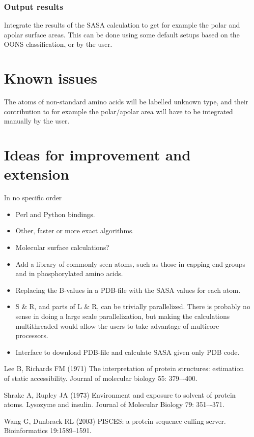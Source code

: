 \documentclass[a4paper,11pt]{article}
\begin{document}
\subsubsection{Output results}
Integrate the results of the SASA calculation to get for example the
polar and apolar surface areas. This can be done using some default
setups based on the OONS classification, or by the user.

\section{Known issues}

The atoms of non-standard amino acids will be labelled unknown type,
and their contribution to for example the polar/apolar area will have
to be integrated manually by the user.

\section{Ideas for improvement and extension}

In no specific order
\begin{itemize}
\item Perl and Python bindings.
\item Other, faster or more exact algorithms.
\item Molecular surface calculations?
\item Add a library of commonly seen atoms, such as those in capping
  end groups and in phosphorylated amino acids.
\item Replacing the B-values in a PDB-file with the SASA values for
  each atom.
\item S \& R, and parts of L \& R, can be trivially
  parallelized. There is probably no sense in doing a large scale
  parallelization, but making the calculations multithreaded would
  allow the users to take advantage of multicore processors.
\item Interface to download PDB-file and calculate SASA given only PDB
  code.
\end{itemize}

\begin{thebibliography}{50}

  Lee B, Richards FM (1971) The interpretation of protein structures: estimation of static accessibility. Journal of molecular biology 55: 379–-400.

  Shrake A, Rupley JA (1973) Environment and exposure to solvent of protein atoms. Lysozyme and insulin. Journal of Molecular Biology 79: 351–-371.

  Wang G, Dunbrack RL (2003) PISCES: a protein sequence culling server. 
  Bioinformatics 19:1589--1591.

\end{thebibliography}
\end{document}
